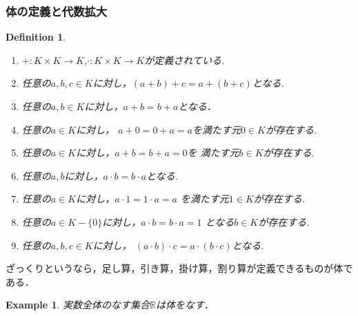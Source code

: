\documentclass{ujarticle}
\newtheorem{dfn}[thm]{Definition}
\newtheorem{epl}[thm]{Example}
\begin{document}
\subsubsection{体の定義と代数拡大}
\label{sub:体の定義と代数拡大}
\begin{dfn}
  \begin{enumerate}
    \setlength{\parskip}{0cm} %
    \setlength{\itemsep}{0cm} %
    \item $+:K \times K \to K$,$\cdot:K \times K \to K $が定義されている.
    \item 任意の$a,b,c \in K$に対し，$(a + b) +c =a +(b +c)$となる.
    \item 任意の$a,b \in K$に対し，$a + b = b + a$となる．
    \item 任意の$a \in K$に対し，
              $a + 0 =  0 + a = a$を満たす元$0 \in K$が存在する.
    \item 任意の$a \in K$に対し，$a + b = b + a =0$を
             満たす元$b \in K $が存在する.
    \item 任意の$a,b$に対し，$a \cdot b = b \cdot a$となる.
    \item 任意の$a \in K$に対し，$a \cdot 1 = 1 \cdot a =a$
              を満たす元$1 \in K$が存在する.
    \item 任意の$a \in K-\{0\}$に対し，$a \cdot b = b \cdot a = 1$
              となる$b \in K$が存在する.
    \item 任意の$a,b,c \in K$に対し，
              $(a \cdot b) \cdot c =a \cdot (b \cdot c)$となる.
  \end{enumerate}
\end{dfn}

ざっくりというなら，足し算，引き算，掛け算，割り算が定義できるものが体である．

\begin{epl}
 実数全体のなす集合$\mathbb{R}$は体をなす．
\end{epl}
\end{document}
